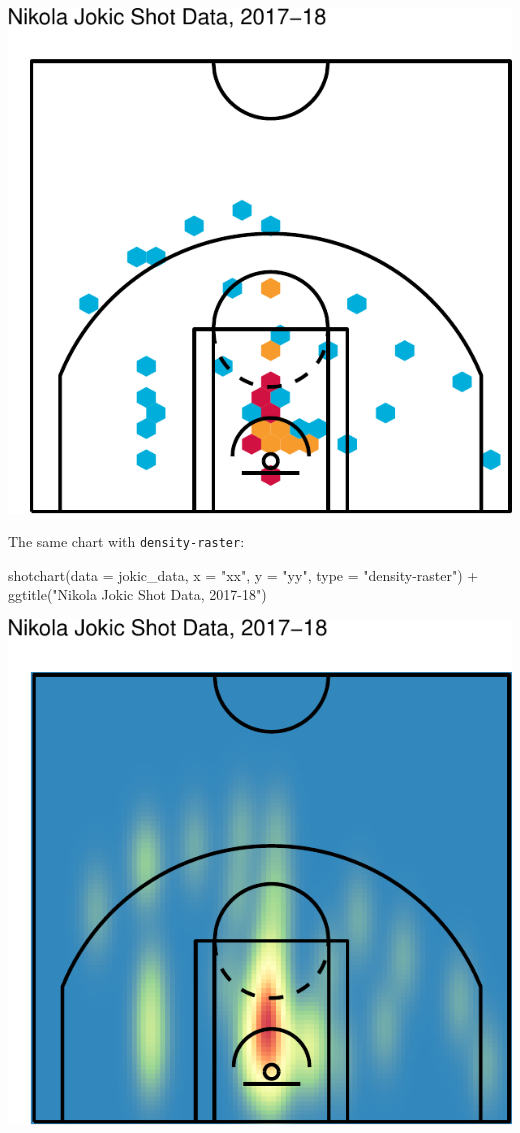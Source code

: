 \documentclass[
  11pt,
]{book}
\newenvironment{Shaded}{\begin{snugshade}}{\end{snugshade}}
\newcommand{\AttributeTok}[1]{\textcolor[rgb]{0.77,0.63,0.00}{#1}}
\newcommand{\FunctionTok}[1]{\textcolor[rgb]{0.00,0.00,0.00}{#1}}
\newcommand{\NormalTok}[1]{#1}
\newcommand{\SpecialCharTok}[1]{\textcolor[rgb]{0.00,0.00,0.00}{#1}}
\newcommand{\StringTok}[1]{\textcolor[rgb]{0.31,0.60,0.02}{#1}}
\theoremstyle{definition}
\theoremstyle{definition}
\theoremstyle{definition}
\theoremstyle{definition}
\theoremstyle{remark}
\begin{document}
\includegraphics{series_files/figure-latex/basketballanalyzer 4-1.pdf}

The same chart with \texttt{density-raster}:

\begin{Shaded}
\begin{Highlighting}[]
\FunctionTok{shotchart}\NormalTok{(}\AttributeTok{data =}\NormalTok{ jokic\_data, }\AttributeTok{x =} \StringTok{"xx"}\NormalTok{, }\AttributeTok{y =} \StringTok{"yy"}\NormalTok{, }\AttributeTok{type =} \StringTok{"density{-}raster"}\NormalTok{) }\SpecialCharTok{+} \FunctionTok{ggtitle}\NormalTok{(}\StringTok{"Nikola Jokic Shot Data, 2017{-}18"}\NormalTok{)}
\end{Highlighting}
\end{Shaded}

\includegraphics{series_files/figure-latex/basketballanalyzer 5-1.pdf}
\end{document}
